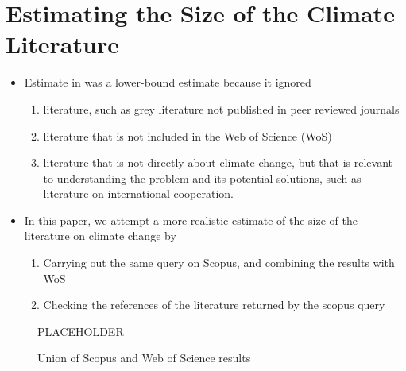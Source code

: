 \documentclass{article}
\begin{document}
\section{Estimating the Size of the Climate Literature}
% 
% 
\begin{itemize}
	\item Estimate in \citet{minx2016learning} was a lower-bound estimate because it ignored
\begin{enumerate}
	\item literature, such as grey literature not published in peer reviewed journals 
    \item literature that is not included in the Web of Science (WoS) 
    \item literature that is not directly about climate change, but that is relevant to understanding the problem and its potential solutions, such as literature on international cooperation.
\end{enumerate}

\item In this paper, we attempt a more realistic estimate of the size of the literature on climate change by
\begin{enumerate}
	\item Carrying out the same query on Scopus, and combining the results with WoS
    \item Checking the references of the literature returned by the scopus query
\end{enumerate}

\end{itemize}


\begin{figure}
PLACEHOLDER
\caption{Union of Scopus and Web of Science results}
\end{figure}
\end{document}
